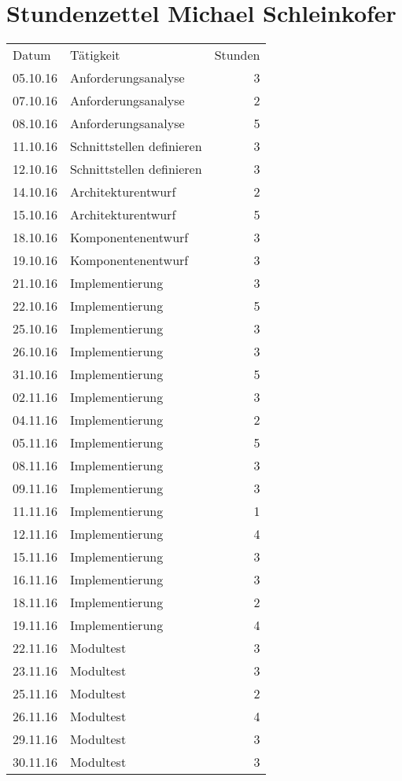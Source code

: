 \chapter{Stundenzettel Michael Schleinkofer}
\begin{minipage}{0.5\textwidth}
    \begin{tabular}{llr}
       Datum& Tätigkeit&Stunden\\
       05.10.16&Anforderungsanalyse&3 \\
       07.10.16&Anforderungsanalyse&2 \\
       08.10.16&Anforderungsanalyse&5 \\
       11.10.16&Schnittstellen definieren&3 \\
       12.10.16&Schnittstellen definieren&3 \\
       14.10.16&Architekturentwurf&2 \\
       15.10.16&Architekturentwurf&5 \\
       18.10.16&Komponentenentwurf&3 \\
       19.10.16&Komponentenentwurf&3 \\
       21.10.16&Implementierung&3 \\
       22.10.16&Implementierung&5 \\
       25.10.16&Implementierung&3 \\
       26.10.16&Implementierung&3 \\
       31.10.16&Implementierung&5 \\
       02.11.16&Implementierung&3 \\
       04.11.16&Implementierung&2 \\
       05.11.16&Implementierung&5 \\
       08.11.16&Implementierung&3 \\
       09.11.16&Implementierung&3 \\
       11.11.16&Implementierung&1 \\
       12.11.16&Implementierung&4 \\
       15.11.16&Implementierung&3 \\
       16.11.16&Implementierung&3 \\
       18.11.16&Implementierung&2 \\
       19.11.16&Implementierung&4 \\
       22.11.16&Modultest&3 \\
       23.11.16&Modultest&3 \\
       25.11.16&Modultest&2 \\
       26.11.16&Modultest&4 \\
       29.11.16&Modultest&3 \\
       30.11.16&Modultest&3 \\
    \end{tabular}
\end{minipage}
